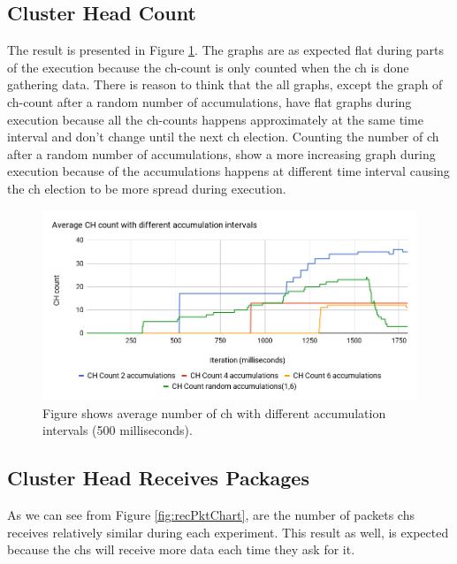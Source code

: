 \documentclass[USenglish]{uit-thesis}
\begin{document}
\newpage

\subsection{Cluster Head Count}

The result is presented in Figure \ref{fig:chCountChart}. The graphs are as expected flat during parts of the execution because the \gls{ch}-count is only counted when the \gls{ch} is done gathering data.
There is reason to think that the all graphs, except the graph of \gls{ch}-count after a random number of accumulations, have flat graphs during execution because all the \gls{ch}-counts happens approximately at the same time interval and don't change until the next \gls{ch} election.
Counting the number of \gls{ch} after a random number of accumulations, show a more increasing graph during execution because of the accumulations happens at different time interval causing the \gls{ch} election to be more spread during execution.

\begin{figure} [ht]
\centering
\includegraphics[width=\textwidth]{chCountChart.png}
\caption{Figure shows average number of \gls{ch} with different accumulation intervals (500 milliseconds).}
\label{fig:chCountChart}
\end{figure}


\newpage

\subsection{Cluster Head Receives Packages}

As we can see from Figure \ref{fig:recPktChart}, are the number of packets \gls{ch}s receives relatively similar during each experiment. This result as well, is expected because the \gls{ch}s will receive more data each time they ask for it.
\end{document}
